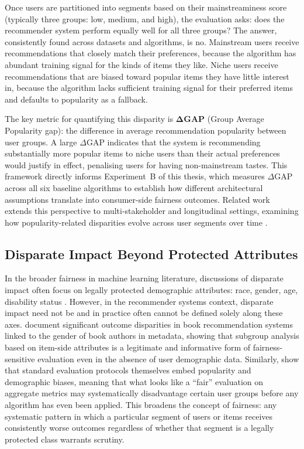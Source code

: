 \documentclass[11pt,a4paper]{report}
\begin{document}
Once users are partitioned into segments based on their mainstreaminess score (typically three groups: low, medium, and high), the evaluation asks: does the recommender system perform equally well for all three groups? The answer, consistently found across datasets and algorithms, is no. Mainstream users receive recommendations that closely match their preferences, because the algorithm has abundant training signal for the kinds of items they like. Niche users receive recommendations that are biased toward popular items they have little interest in, because the algorithm lacks sufficient training signal for their preferred items and defaults to popularity as a fallback.

The key metric for quantifying this disparity is $\boldsymbol{\Delta}$\textbf{GAP} (Group Average Popularity gap): the difference in average recommendation popularity between user groups. A large $\Delta$GAP indicates that the system is recommending substantially more popular items to niche users than their actual preferences would justify in effect, penalising users for having non-mainstream tastes. This framework directly informs Experiment~B of this thesis, which measures $\Delta$GAP across all six baseline algorithms to establish how different architectural assumptions translate into consumer-side fairness outcomes. Related work extends this perspective to multi-stakeholder and longitudinal settings, examining how popularity-related disparities evolve across user segments over time \citep{abdollahpouri2020multistakeholder}.

\subsection*{Disparate Impact Beyond Protected Attributes}

In the broader fairness in machine learning literature, discussions of disparate impact often focus on legally protected demographic attributes: race, gender, age, disability status \citep{barocashardt2016fairness, dwork2012fairness}. However, in the recommender systems context, disparate impact need not be and in practice often cannot be defined solely along these axes. \citet{ekstrand2018exploringgender} document significant outcome disparities in book recommendation systems linked to the gender of book authors in metadata, showing that subgroup analysis based on item-side attributes is a legitimate and informative form of fairness-sensitive evaluation even in the absence of user demographic data. Similarly, \citet{ekstrand2018all} show that standard evaluation protocols themselves embed popularity and demographic biases, meaning that what looks like a ``fair'' evaluation on aggregate metrics may systematically disadvantage certain user groups before any algorithm has even been applied. This broadens the concept of fairness: any systematic pattern in which a particular segment of users or items receives consistently worse outcomes regardless of whether that segment is a legally protected class warrants scrutiny.
\end{document}
